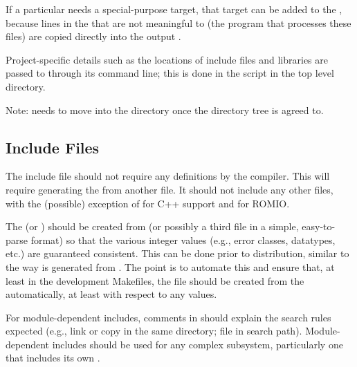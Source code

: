 \documentclass{article}
\begin{document}
If a particular  needs a special-purpose target, that target
can be added to the , because lines in the
 that are not meaningful to  (the
program that processes these 
files) are copied directly into the output .  

Project-specific details such as the locations of include files and libraries
are passed to  through its command line; this is done in the
 script in the top level directory.

Note:  needs to move into the 
directory once the directory tree is agreed to.

\subsection{Include Files}
The include file  should not require any 
definitions by the compiler.  This will require generating the
 from another file.
It should not include any other
files, with the (possible) exception of  for C++
support and  for ROMIO.

The  (or ) should be created from
 (or possibly a third file in a simple, easy-to-parse
format) so that the various integer values (e.g., error classes, 
datatypes, etc.) are guaranteed consistent.  This can be done prior to
distribution, similar to the way  is generated from
.  The point is to automate this and ensure that,
at least in the development Makefiles, the  file
should be created from the  automatically, at least with
respect to any values. 



For module-dependent includes, comments in  should explain the
search rules expected (e.g., link or copy in the same directory; file in
search path).  Module-dependent includes should be used for any complex
subsystem, particularly one that includes its own .
\end{document}
